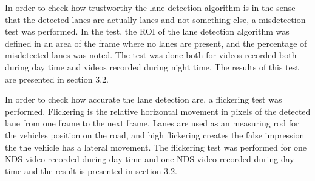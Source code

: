 In order to check how trustworthy the lane detection algorithm is in the sense that the detected lanes are actually lanes and not something else, a misdetection test was performed. In the test, the ROI of the lane detection algorithm was defined in an area of the frame where no lanes are present, and the percentage of misdetected lanes was noted. The test was done both for videos recorded both during day time and videos recorded during night time. The results of this test are presented in section 3.2.

In order to check how accurate the lane detection are, a flickering test was performed. Flickering is the relative horizontal movement in pixels of the detected lane from one frame to the next frame. Lanes are used as an measuring rod for the vehicles position on the road, and high flickering creates the false impression the the vehicle has a lateral movement. The flickering test was performed for one NDS video recorded during day time and one NDS video recorded during day time and the result is presented in section 3.2.


